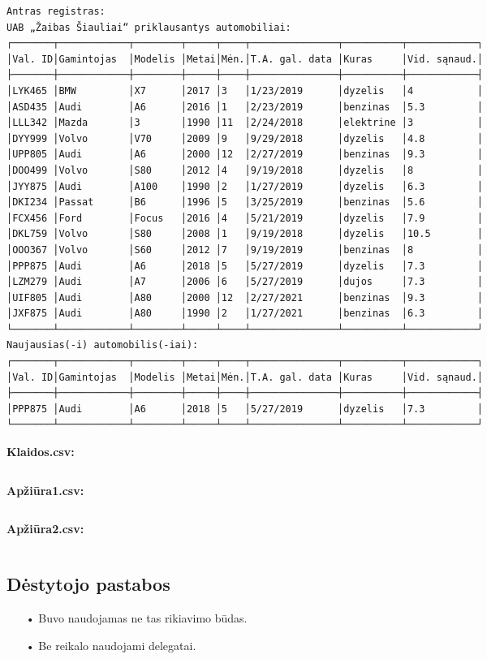 \documentclass{article}
\begin{document}
\begin{verbatim}
Antras registras:
UAB „Žaibas Šiauliai“ priklausantys automobiliai:
┌───────┬────────────┬────────┬─────┬────┬───────────────┬──────────┬────────────┐
│Val. ID│Gamintojas  │Modelis │Metai│Mėn.│T.A. gal. data │Kuras     │Vid. sąnaud.│
├───────┼────────────┼────────┼─────┼────┼───────────────┼──────────┼────────────┤
│LYK465 │BMW         │X7      │2017 │3   │1/23/2019      │dyzelis   │4           │
│ASD435 │Audi        │A6      │2016 │1   │2/23/2019      │benzinas  │5.3         │
│LLL342 │Mazda       │3       │1990 │11  │2/24/2018      │elektrine │3           │
│DYY999 │Volvo       │V70     │2009 │9   │9/29/2018      │dyzelis   │4.8         │
│UPP805 │Audi        │A6      │2000 │12  │2/27/2019      │benzinas  │9.3         │
│DOO499 │Volvo       │S80     │2012 │4   │9/19/2018      │dyzelis   │8           │
│JYY875 │Audi        │A100    │1990 │2   │1/27/2019      │dyzelis   │6.3         │
│DKI234 │Passat      │B6      │1996 │5   │3/25/2019      │benzinas  │5.6         │
│FCX456 │Ford        │Focus   │2016 │4   │5/21/2019      │dyzelis   │7.9         │
│DKL759 │Volvo       │S80     │2008 │1   │9/19/2018      │dyzelis   │10.5        │
│OOO367 │Volvo       │S60     │2012 │7   │9/19/2019      │benzinas  │8           │
│PPP875 │Audi        │A6      │2018 │5   │5/27/2019      │dyzelis   │7.3         │
│LZM279 │Audi        │A7      │2006 │6   │5/27/2019      │dujos     │7.3         │
│UIF805 │Audi        │A80     │2000 │12  │2/27/2021      │benzinas  │9.3         │
│JXF875 │Audi        │A80     │1990 │2   │1/27/2021      │benzinas  │6.3         │
└───────┴────────────┴────────┴─────┴────┴───────────────┴──────────┴────────────┘
Naujausias(-i) automobilis(-iai):
┌───────┬────────────┬────────┬─────┬────┬───────────────┬──────────┬────────────┐
│Val. ID│Gamintojas  │Modelis │Metai│Mėn.│T.A. gal. data │Kuras     │Vid. sąnaud.│
├───────┼────────────┼────────┼─────┼────┼───────────────┼──────────┼────────────┤
│PPP875 │Audi        │A6      │2018 │5   │5/27/2019      │dyzelis   │7.3         │
└───────┴────────────┴────────┴─────┴────┴───────────────┴──────────┴────────────┘
\end{verbatim}
\normalsize

\pagebreak

\textbf{Klaidos.csv:}
\inputminted{csharp}{Assets/L3/klaidos2.csv}

\textbf{Apžiūra1.csv:}
\inputminted{csharp}{Assets/L3/apziura2-1.csv}

\textbf{Apžiūra2.csv:}
\inputminted{csharp}{Assets/L3/apziura2-2.csv}

\subsection{Dėstytojo pastabos}
\begin{itemize}
    \item[•]Buvo naudojamas ne tas rikiavimo būdas.
    \item[•]Be reikalo naudojami delegatai.
\end{itemize}
\end{document}
